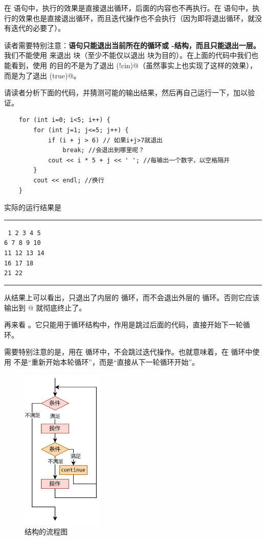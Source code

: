 在 \lstinline@while@ 语句中，\lstinline@break@ 执行的效果是直接退出循环，后面的内容也不再执行。在 \lstinline@for@ 语句中，\lstinline@break@ 执行的效果也是直接退出循环，而且迭代操作也不会执行（因为即将退出循环，就没有迭代的必要了）。\par
读者需要特别注意：\textbf{\lstinline@break@ 语句只能退出当前所在的循环或 \lstinline@switch@-\lstinline@case@ 结构，而且只能退出一层。}我们不能使用 \lstinline@break@ 来退出 \lstinline@if@ 块（至少不能仅以退出 \lstinline@if@ 块为目的）。在上面的代码中我们也能看到，使用 \lstinline@break@ 的目的不是为了退出 \lstinline@if(!cin)@（虽然事实上也实现了这样的效果），而是为了退出 \lstinline@while(true)@。\par
请读者分析下面的代码，并猜测可能的输出结果，然后再自己运行一下，加以验证。
\begin{lstlisting}
    for (int i=0; i<5; i++) {
        for (int j=1; j<=5; j++) {
            if (i + j > 6) // 如果i+j>7就退出
                break; //会退出到哪里呢？
            cout << i * 5 + j << ' '; //每输出一个数字，以空格隔开
        }
        cout << endl; //换行
    }
\end{lstlisting}
实际的运行结果是\\\noindent\rule{\linewidth}{0.2pt}\texttt{
1 2 3 4 5\\
6 7 8 9 10\\
11 12 13 14\\
16 17 18\\
21 22
}\\\noindent\rule{\linewidth}{0.2pt}
从结果上可以看出，\lstinline@break@ 只退出了内层的 \lstinline@for@ 循环，而不会退出外层的 \lstinline@for@ 循环。否则它应该输出到 @ 就彻底终止了。\par
再来看 \lstinline@continue@。它只能用于循环结构中，作用是跳过后面的代码，直接开始下一轮循环。\par
需要特别注意的是，\lstinline@continue@ 用在 \lstinline@for@ 循环中，不会跳过迭代操作。也就意味着，在 \lstinline@for@ 循环中使用 \lstinline@continue@ 不是``重新开始本轮循环''，而是``直接从下一轮循环开始''。\par
\begin{figure}[htbp]
   \centering
   \includegraphics[width=0.35\textwidth]{../images/generalized_parts/03_structure_of_continue.drawio.png}
   \caption{\lstinline@continue@ 结构的流程图}
\end{figure}
